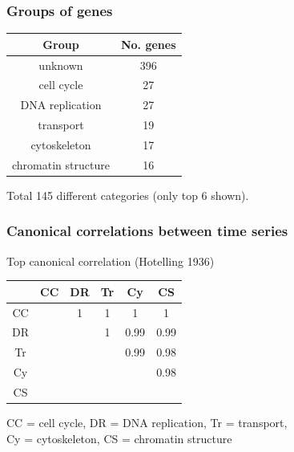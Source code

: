 \documentclass{beamer}
\begin{document}
\begin{frame}
\frametitle{Groups of genes}
\begin{center}
\begin{tabular}{c|c}
Group & No. genes \\ \hline
unknown & 396 \\
cell cycle & 27 \\
DNA replication & 27 \\
transport & 19 \\
cytoskeleton & 17\\
chromatin structure & 16 \\\hline
\end{tabular}
\end{center}

\vspace{0.5in}
Total 145 different categories (only top 6 shown).
\end{frame}


\begin{frame}
\frametitle{Canonical correlations between time series}
Top canonical correlation (Hotelling 1936)

\begin{center}
\begin{tabular}{c|c|c|c|c|c|} 
   & CC   & DR   & Tr   & Cy   & CS  \\ \hline
CC &      & 1    & 1    & 1    & 1   \\ \hline
DR &      &      & 1    & 0.99 & 0.99\\ \hline
Tr &      &      &      & 0.99 & 0.98\\ \hline
Cy &      &      &      &      & 0.98\\ \hline
CS &      &      &      &      &     \\ \hline
\end{tabular}
\end{center}

\vspace{0.5in}
CC = cell cycle, DR = DNA replication, Tr = transport, \\
Cy = cytoskeleton, CS = chromatin structure
\end{frame}


\end{document}
